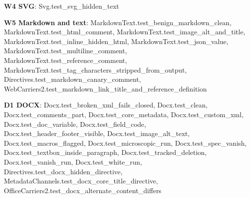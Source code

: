 \documentclass[10pt,a4paper]{article}
\begin{document}
\textbf{W4 SVG}: \textcolor{ok}{Svg.\allowbreak{}test\_\allowbreak{}svg\_\allowbreak{}hidden\_\allowbreak{}text}\par
\textbf{W5 Markdown and text}: \textcolor{ok}{MarkdownText.\allowbreak{}test\_\allowbreak{}benign\_\allowbreak{}markdown\_\allowbreak{}clean}, \textcolor{ok}{MarkdownText.\allowbreak{}test\_\allowbreak{}html\_\allowbreak{}comment}, \textcolor{ok}{MarkdownText.\allowbreak{}test\_\allowbreak{}image\_\allowbreak{}alt\_\allowbreak{}and\_\allowbreak{}title}, \textcolor{ok}{MarkdownText.\allowbreak{}test\_\allowbreak{}inline\_\allowbreak{}hidden\_\allowbreak{}html}, \textcolor{ok}{MarkdownText.\allowbreak{}test\_\allowbreak{}json\_\allowbreak{}value}, \textcolor{ok}{MarkdownText.\allowbreak{}test\_\allowbreak{}multiline\_\allowbreak{}comment}, \textcolor{ok}{MarkdownText.\allowbreak{}test\_\allowbreak{}reference\_\allowbreak{}comment}, \textcolor{ok}{MarkdownText.\allowbreak{}test\_\allowbreak{}tag\_\allowbreak{}characters\_\allowbreak{}stripped\_\allowbreak{}from\_\allowbreak{}output}, \textcolor{ok}{Directives.\allowbreak{}test\_\allowbreak{}markdown\_\allowbreak{}canary\_\allowbreak{}comment}, \textcolor{ok}{WebCarriers2.\allowbreak{}test\_\allowbreak{}markdown\_\allowbreak{}link\_\allowbreak{}title\_\allowbreak{}and\_\allowbreak{}reference\_\allowbreak{}definition}\par
\textbf{D1 DOCX}: \textcolor{ok}{Docx.\allowbreak{}test\_\allowbreak{}broken\_\allowbreak{}xml\_\allowbreak{}fails\_\allowbreak{}closed}, \textcolor{ok}{Docx.\allowbreak{}test\_\allowbreak{}clean}, \textcolor{ok}{Docx.\allowbreak{}test\_\allowbreak{}comments\_\allowbreak{}part}, \textcolor{ok}{Docx.\allowbreak{}test\_\allowbreak{}core\_\allowbreak{}metadata}, \textcolor{ok}{Docx.\allowbreak{}test\_\allowbreak{}custom\_\allowbreak{}xml}, \textcolor{ok}{Docx.\allowbreak{}test\_\allowbreak{}doc\_\allowbreak{}variable}, \textcolor{ok}{Docx.\allowbreak{}test\_\allowbreak{}field\_\allowbreak{}code}, \textcolor{ok}{Docx.\allowbreak{}test\_\allowbreak{}header\_\allowbreak{}footer\_\allowbreak{}visible}, \textcolor{ok}{Docx.\allowbreak{}test\_\allowbreak{}image\_\allowbreak{}alt\_\allowbreak{}text}, \textcolor{ok}{Docx.\allowbreak{}test\_\allowbreak{}macros\_\allowbreak{}flagged}, \textcolor{ok}{Docx.\allowbreak{}test\_\allowbreak{}microscopic\_\allowbreak{}run}, \textcolor{ok}{Docx.\allowbreak{}test\_\allowbreak{}spec\_\allowbreak{}vanish}, \textcolor{ok}{Docx.\allowbreak{}test\_\allowbreak{}textbox\_\allowbreak{}inside\_\allowbreak{}paragraph}, \textcolor{ok}{Docx.\allowbreak{}test\_\allowbreak{}tracked\_\allowbreak{}deletion}, \textcolor{ok}{Docx.\allowbreak{}test\_\allowbreak{}vanish\_\allowbreak{}run}, \textcolor{ok}{Docx.\allowbreak{}test\_\allowbreak{}white\_\allowbreak{}run}, \textcolor{ok}{Directives.\allowbreak{}test\_\allowbreak{}docx\_\allowbreak{}hidden\_\allowbreak{}directive}, \textcolor{ok}{MetadataChannels.\allowbreak{}test\_\allowbreak{}docx\_\allowbreak{}core\_\allowbreak{}title\_\allowbreak{}directive}, \textcolor{ok}{OfficeCarriers2.\allowbreak{}test\_\allowbreak{}docx\_\allowbreak{}alternate\_\allowbreak{}content\_\allowbreak{}differs}\par
\end{document}

